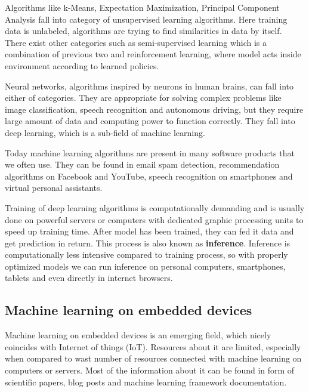 Algorithms like k-Means, Expectation Maximization, Principal Component Analysis fall into category of unsupervised learning algorithms.
Here training data is unlabeled, algorithms are trying to find similarities in data by itself\cite{geron}.
There exist other categories such as semi-supervised learning which is a combination of previous two and reinforcement learning, where model acts inside environment according to learned policies\cite{geron}.

Neural networks, algorithms inspired by neurons in human brains\cite{geron}\cite{cs231n}, can fall into either of categories. 
They are appropriate for solving complex problems like image classification, speech recognition and autonomous driving, but they require large amount of data and computing power to function correctly.
They fall into deep learning, which is a sub-field of machine learning.

Today machine learning algorithms are present in many software products that we often use. 
They can be found in email spam detection, recommendation algorithms on Facebook and YouTube, speech recognition on smartphones and virtual personal assistants. 

Training of deep learning algorithms is computationally demanding and is usually done on powerful servers or computers with dedicated graphic processing units to speed up training time.
After model has been trained, they can fed it data and get prediction in return. 
This process is also known as \textbf{inference}.
Inference is computationally less intensive compared to training process, so with properly optimized models we can run inference on personal computers, smartphones, tablets and even directly in internet browsers.


\subsection{ Machine learning on embedded devices}

Machine learning on embedded devices is an emerging field, which nicely coincides with Internet of things (IoT).
Resources about it are limited, especially when compared to wast number of resources connected with machine learning on computers or servers.
Most of the information about it can be found in form of scientific papers, blog posts and machine learning framework documentation\cite{hello_edge}\cite{tflite_risc-v}\cite{pete_tiny}.


